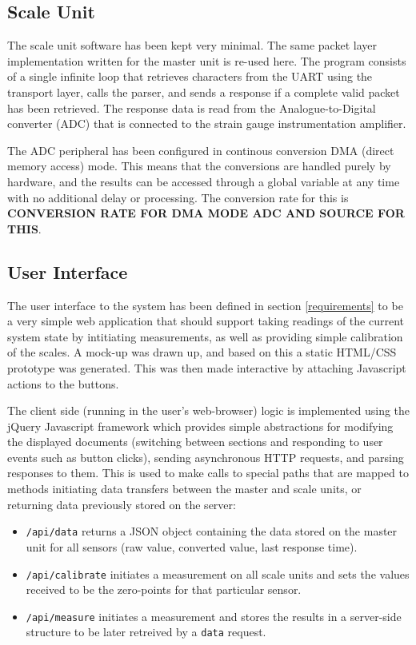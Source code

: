 \subsection{Scale Unit}
The scale unit software has been kept very minimal. The same packet layer implementation written for the master unit is re-used here. The program consists of a single infinite loop that retrieves characters from the UART using the transport layer, calls the parser, and sends a response if a complete valid packet has been retrieved. The response data is read from the Analogue-to-Digital converter (ADC) that is connected to the strain gauge instrumentation amplifier.

The ADC peripheral has been configured in continous conversion DMA (direct memory access) mode. This means that the conversions are handled purely by hardware, and the results can be accessed through a global variable at any time with no additional delay or processing. The conversion rate for this is \textbf{CONVERSION RATE FOR DMA MODE ADC AND SOURCE FOR THIS}.


\subsection{User Interface}
The user interface to the system has been defined in section \ref{requirements} to be a very simple web application that should support taking readings of the current system state by intitiating measurements, as well as providing simple calibration of the scales. A mock-up was drawn up, and based on this a static HTML/CSS prototype was generated. This was then made interactive by attaching Javascript actions to the buttons.

The client side (running in the user's web-browser) logic is implemented using the jQuery Javascript framework \cite{jquery} which provides simple abstractions for modifying the displayed documents (switching between sections and responding to user events such as button clicks), sending asynchronous HTTP requests, and parsing responses to them. This is used to make calls to special paths that are mapped to methods initiating data transfers between the master and scale units, or returning data previously stored on the server:

\begin{itemize}
	\item \texttt{/api/data} returns a JSON \cite{json-spec} object containing the data stored on the master unit for all sensors (raw value, converted value, last response time).
	\item \texttt{/api/calibrate} initiates a measurement on all scale units and sets the values received to be the zero-points for that particular sensor.
	\item \texttt{/api/measure} initiates a measurement and stores the results in a server-side structure to be later retreived by a \texttt{data} request.
\end{itemize}

